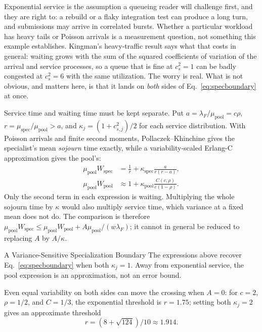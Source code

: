 \documentclass[11pt,a4paper]{article}
\theoremstyle{definition}
\theoremstyle{plain}
\begin{document}
\ifpdmargincolumn\pdheavytailsketch\fi
Exponential service is the assumption a queueing reader will challenge first, and
they are right to: a rebuild or a flaky integration test can produce a long turn,
and submissions may arrive in correlated bursts. Whether a particular workload
has heavy tails or Poisson arrivals is a measurement question, not something this
example establishes. Kingman's heavy-traffic result  says what
that costs in general: waiting grows with the sum of the squared coefficients of
variation of the arrival and service processes, so a queue that is fine at
$c_s^2=1$ can be badly congested at $c_s^2=6$ with the same utilization. The
worry is real. What is not obvious, and matters here, is that it lands on
\emph{both} sides of Eq.~\ref{eq:specboundary} at once.

Service time and waiting time must be kept separate. Put
$a=\lambda_F/\mu_{\mathrm{pool}}=c\rho$,
$r=\mu_{\mathrm{spec}}/\mu_{\mathrm{pool}}>a$, and
$\kappa_j=(1+c_{s,j}^2)/2$ for each service distribution. With Poisson arrivals
and finite second moments, Pollaczek--Khinchine gives the specialist's mean
\emph{sojourn} time exactly, while a variability-scaled Erlang-C approximation
 gives the pool's:
\begin{align}
 \mu_{\mathrm{pool}} W_{\mathrm{spec}}
   &= \frac{1}{r}+\kappa_{\mathrm{spec}}\frac{a}{r(r-a)},\\
 \mu_{\mathrm{pool}} W_{\mathrm{pool}}
   &\approx 1+\kappa_{\mathrm{pool}}
       \frac{C(c,\rho)}{c(1-\rho)}.
\end{align}
Only the second term in each expression is waiting. Multiplying the whole
sojourn time by $\kappa$ would also multiply service time, which variance at a
fixed mean does not do. The comparison is therefore
$\mu_{\mathrm{pool}}W_{\mathrm{spec}}\le
 \mu_{\mathrm{pool}}W_{\mathrm{pool}}+A\mu_{\mathrm{pool}}/(w\lambda_F)$;
it cannot in general be reduced to replacing $A$ by $A/\kappa$.

\begin{pdexample}{A Variance-Sensitive Specialization Boundary}
\setlength{\parskip}{4pt plus 1pt}
\label{hyp:spec-variance}
The expressions above recover Eq.~\ref{eq:specboundary} when both
$\kappa_j=1$. Away from exponential service, the pool expression is an
approximation, not an error bound.

Even equal variability on both sides can move
the crossing when $A=0$: for $c=2$, $\rho=1/2$, and $C=1/3$, the exponential
threshold is $r=1.75$; setting both $\kappa_j=2$ gives an approximate threshold
\[
r=(8+\sqrt{124})/10\approx1.914.
\]
\end{pdexample}
\end{document}
